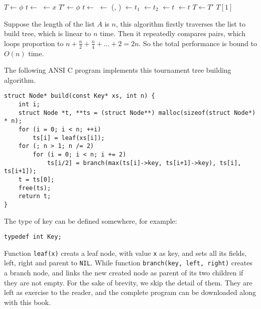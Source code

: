 \documentclass{article}
\begin{document}
\begin{algorithmic}
  \State $T \gets \phi$
    \State $t \gets $ 
    \State {} $\gets x$
    \State {}
  \EndFor
    \State $T' \gets \phi$
      \State $t \gets $ 
      \State {} $\gets$ (, )
      \State {} $\gets t_1$
      \State {} $\gets t_2$
      \State {} $\gets t$
      \State {} $\gets t$
      \State {}
    \EndFor
    \State $T \gets T'$
  \EndWhile
  \State \Return $T[1]$
\EndFunction
\end{algorithmic}

Suppose the length of the list $A$ is $n$, this algorithm firstly traverses the list to build tree,
which is linear to $n$ time. Then it repeatedly compares pairs, which loops proportion to
$n + \frac{n}{2} + \frac{n}{4} + ... + 2 = 2n$. So the total performance is bound to $O(n)$ time.

The following ANSI C program implements this tournament tree building algorithm.

\lstset{language=C}
\begin{lstlisting}
struct Node* build(const Key* xs, int n) {
    int i;
    struct Node *t, **ts = (struct Node**) malloc(sizeof(struct Node*) * n);
    for (i = 0; i < n; ++i)
        ts[i] = leaf(xs[i]);
    for (; n > 1; n /= 2)
        for (i = 0; i < n; i += 2)
            ts[i/2] = branch(max(ts[i]->key, ts[i+1]->key), ts[i], ts[i+1]);
    t = ts[0];
    free(ts);
    return t;
}
\end{lstlisting}

The type of key can be defined somewhere, for example:

\lstset{language=C}
\begin{lstlisting}
typedef int Key;
\end{lstlisting}

Function \texttt{leaf(x)} creats a leaf node, with value \texttt{x} as key,
and sets all its fields, left, right and parent to \texttt{NIL}.
While function \texttt{branch(key, left, right)} creates a branch node, and links the new
created node as parent of its two children if they are not empty. For the sake of
brevity, we skip the detail of them. They are left as exercise to the reader, and
the complete program can be downloaded along with this book.
\end{document}
